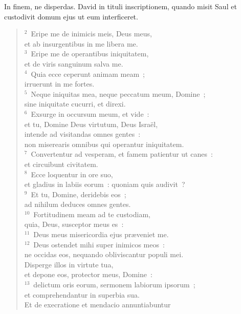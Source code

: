\lettrine[lines=3,image=true,loversize=0.05,lraise=-0.03]{I}{}n finem, ne disperdas. David in tituli inscriptionem, quando misit Saul et custodivit domum ejus ut eum interficeret.
\begin{flushleft}\begin{verse}\vspace{6pt}${}^{2}$~Eripe me de inimicis meis, Deus meus,\\ et ab insurgentibus in me libera me.\\
${}^{3}$~Eripe me de operantibus iniquitatem,\\ et de viris sanguinum salva me.\\
${}^{4}$~Quia ecce ceperunt animam meam~;\\ irruerunt in me fortes.\\
${}^{5}$~Neque iniquitas mea, neque peccatum meum, Domine~;\\ sine iniquitate cucurri, et direxi.\\
${}^{6}$~Exsurge in occursum meum, et vide~:\\ et tu, Domine Deus virtutum, Deus Isra\"el,\\ intende ad visitandas omnes gentes~:\\ non miserearis omnibus qui operantur iniquitatem.\\
${}^{7}$~Convertentur ad vesperam, et famem patientur ut canes~:\\ et circuibunt civitatem.\\
${}^{8}$~Ecce loquentur in ore suo,\\ et gladius in labiis eorum~: quoniam quis audivit~?\\
${}^{9}$~Et tu, Domine, deridebis eos~;\\ ad nihilum deduces omnes gentes.\\
${}^{10}$~Fortitudinem meam ad te custodiam,\\ quia, Deus, susceptor meus es~:\\
${}^{11}$~Deus meus misericordia ejus pr\ae veniet me.\\
${}^{12}$~Deus ostendet mihi super inimicos meos~:\\ ne occidas eos, nequando obliviscantur populi mei.\\ Disperge illos in virtute tua,\\ et depone eos, protector meus, Domine~:\\
${}^{13}$~delictum oris eorum, sermonem labiorum ipsorum~;\\ et comprehendantur in superbia sua.\\ Et de execratione et mendacio annuntiabuntur

\end{verse}
\end{flushleft}
